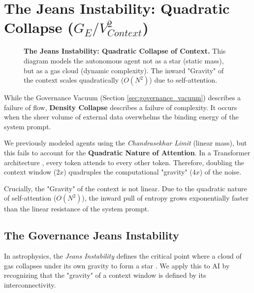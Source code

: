 \documentclass[11pt, a4paper]{article}
\newcommand{\Ge}{G_E}
\newcommand{\Vctx}{V_{Context}}
\begin{document}
\section{The Jeans Instability: Quadratic Collapse ($\Ge / \Vctx^2$)}
\label{sec:density_collapse}

\begin{figure}[t!]
    \centering
    \resizebox{0.71\textwidth}{!}{}
    \caption[\textbf{The Jeans Instability.}]{\textbf{The Jeans Instability: Quadratic Collapse of Context.} This diagram models the autonomous agent not as a star (static mass), but as a gas cloud (dynamic complexity). The inward "Gravity" of the context scales quadratically ($O(N^2)$) due to self-attention.}
    \label{fig:density_collapse}
\end{figure}

While the Governance Vacuum (Section \ref{sec:governance_vacuum}) describes a failure of flow, \textbf{Density Collapse} describes a failure of complexity. It occurs when the sheer volume of external data overwhelms the binding energy of the system prompt.

We previously modeled agents using the \textit{Chandrasekhar Limit} (linear mass), but this fails to account for the \textbf{Quadratic Nature of Attention}. In a Transformer architecture \cite{vaswani2017}, every token attends to every other token. Therefore, doubling the context window ($2x$) quadruples the computational "gravity" ($4x$) of the noise.

Crucially, the "Gravity" of the context is not linear. Due to the quadratic nature of self-attention ($O(N^2)$), the inward pull of entropy grows exponentially faster than the linear resistance of the system prompt.

\subsection{The Governance Jeans Instability}

In astrophysics, the \textit{Jeans Instability} defines the critical point where a cloud of gas collapses under its own gravity to form a star \cite{jeans1902}. We apply this to AI by recognizing that the "gravity" of a context window is defined by its interconnectivity.
\end{document}
